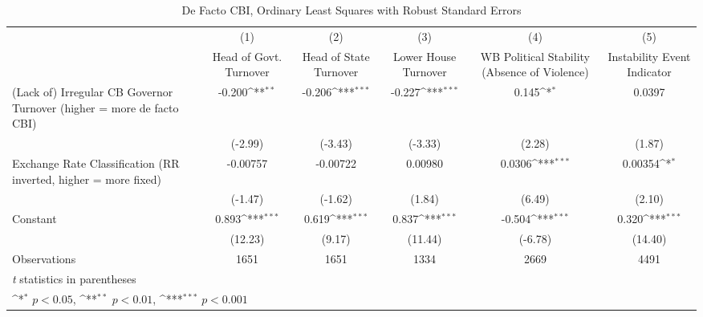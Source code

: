 \begin{table}[htbp]\centering
\def\sym#1{\ifmmode^{#1}\else\(^{#1}\)\fi}
\caption{De Facto CBI, Ordinary Least Squares with Robust Standard Errors \label{multIndOLSDJ}}
\begin{tabular*}{\linewidth}{@{\hskip\tabcolsep\extracolsep\fill}l*{5}{c}}
\hline\hline
                &\multicolumn{1}{c}{(1)}&\multicolumn{1}{c}{(2)}&\multicolumn{1}{c}{(3)}&\multicolumn{1}{c}{(4)}&\multicolumn{1}{c}{(5)}\\
                &\multicolumn{1}{c}{Head of Govt. Turnover}&\multicolumn{1}{c}{Head of State Turnover}&\multicolumn{1}{c}{Lower House Turnover}&\multicolumn{1}{c}{WB Political Stability (Absence of Violence)}&\multicolumn{1}{c}{Instability Event Indicator}\\
\hline
(Lack of) Irregular CB Governor Turnover (higher = more de facto CBI)&   -0.200\sym{**} &   -0.206\sym{***}&   -0.227\sym{***}&    0.145\sym{*}  &   0.0397         \\
                &  (-2.99)         &  (-3.43)         &  (-3.33)         &   (2.28)         &   (1.87)         \\
[1em]
Exchange Rate Classification (RR inverted, higher = more fixed)& -0.00757         & -0.00722         &  0.00980         &   0.0306\sym{***}&  0.00354\sym{*}  \\
                &  (-1.47)         &  (-1.62)         &   (1.84)         &   (6.49)         &   (2.10)         \\
[1em]
Constant        &    0.893\sym{***}&    0.619\sym{***}&    0.837\sym{***}&   -0.504\sym{***}&    0.320\sym{***}\\
                &  (12.23)         &   (9.17)         &  (11.44)         &  (-6.78)         &  (14.40)         \\
\hline
Observations    &     1651         &     1651         &     1334         &     2669         &     4491         \\
\hline\hline
\multicolumn{6}{l}{\footnotesize \textit{t} statistics in parentheses}\\
\multicolumn{6}{l}{\footnotesize \sym{*} \(p<0.05\), \sym{**} \(p<0.01\), \sym{***} \(p<0.001\)}\\
\end{tabular*}
\end{table}
